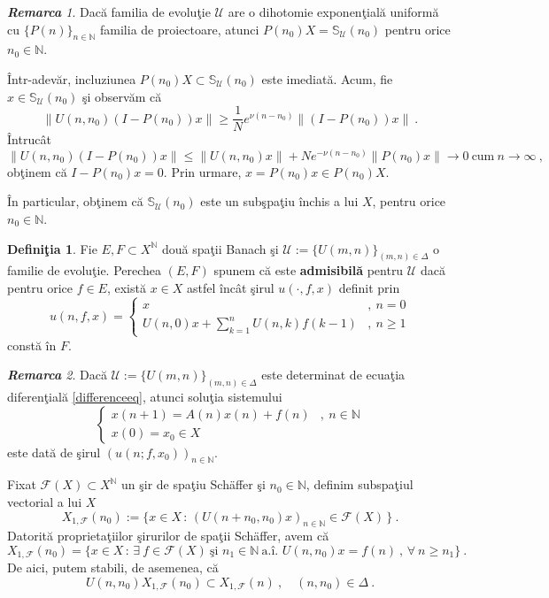 \documentclass[ a4paper, 12pt]{report}
\newcommand{\F}{\mathcal{F}}
\newcommand{\N}{\mathbb{N}}
\newcommand{\defnemph}[1]{\textbf{#1}}
\theoremstyle{definition}
\newtheorem{definition}{\bf Defini\c tia}[section]
\theoremstyle{remark}
\newtheorem{remarc}{\bf Remarca}[section]
\numberwithin{equation}{section}
\begin{document}
\begin{remarc}
Dac\u a familia de evolu\c tie $\mathcal{U}$ are o dihotomie exponen\c tial\u a uniform\u a cu $\{P(n)\}_{n\in\N}$ familia de proiectoare,
atunci $P(n_0)X=\mathbb{S}_{\mathcal{U}}(n_0)$ pentru orice $n_0\in\N$.

\^Intr-adev\u ar, incluziunea $P(n_0)X\subset\mathbb{S}_{\mathcal{U}}(n_0)$ este imediat\u a. Acum, fie \\ $x\in\mathbb{S}_{\mathcal{U}}(n_0)$ %
\c si observ\u am c\u a
$$\|U(n,n_0)(I-P(n_0))x\|\geq \frac{1}{N}e^{\nu(n-n_0)}\|(I-P(n_0))x\|\ .$$
\^Intruc\^at
$$\|U(n,n_0)(I-P(n_0))x\|\leq \|U(n,n_0)x\| + Ne^{-\nu(n-n_0)}\|P(n_0)x\| \to 0 \ \text{cum}\ n\to\infty\ ,$$
ob\c tinem c\u a $I-P(n_0)x=0$. Prin urmare, $x=P(n_0)x\in P(n_0)X$.

\^In particular, ob\c tinem c\u a $\mathbb{S}_{\mathcal{U}}(n_0)$ este un sub\c spa\c tiu \^inchis a lui $X$, pentru orice $n_0\in\N$.
\end{remarc}


\begin{definition}
\label{defn:admissibility}
Fie $E,F\subset X^{\N}$ dou\u a spa\c tii Banach \c si
$\mathcal{U}:=\{U(m,n)\}_{(m,n)\in\Delta}$ o familie de evolu\c tie.
Perechea $(E,F)$ spunem c\u a este \defnemph{admisibil\u a} pentru $\mathcal{U}$ dac\u a
pentru orice $f\in E$, exist\u a $x\in X$ astfel \^inc\^at \c sirul $u(\cdot,f,x)$ definit prin
$$u(n,f,x)= \begin{cases}
x &,\ n=0\\
\displaystyle U(n,0)x + \sum_{k=1}^{n}U(n,k)f(k-1) &,\ n\geq 1
\end{cases}
 $$
const\u a \^in $F$.
\end{definition}

\begin{remarc}
Dac\u a $\mathcal{U}:=\{U(m,n)\}_{(m,n)\in\Delta}$ este determinat de ecua\c tia diferen\c tial\u a \eqref{differenceeq}, atunci
solu\c tia sistemului
$$\begin{cases}
x(n+1)=A(n) x(n) + f(n) &,\ n\in\N\\
x(0)=x_0\in X &
\end{cases} $$
este dat\u a de \c sirul $(u(n;f,x_0))_{n\in\N}$.
\end{remarc}


Fixat $\F(X)\subset X^{\N}$ un \c sir de spa\c tiu Sch\"{a}ffer  \c si
$n_0\in\N$, definim subspa\c tiul vectorial a lui $X$
\begin{equation}
X_{1,\F}(n_0):= \{x\in X\,:\, \left(U(n+n_0,n_0)x\right)_{n\in\N} \in \F(X)\,\}\ .
\end{equation}
Datorit\u a proprieta\c tiilor \c sirurilor de spa\c tii Sch\"{a}ffer, avem c\u a
$$X_{1,\F}(n_0)=\{x\in X\,:\, \exists\ f\in \F(X)\ \text{\c si } n_1\in\N\ \text{a.\^i. }
U(n,n_0)x=f(n)\ \text{, } \forall\ n\geq n_1\}\ .$$
De aici, putem stabili, de asemenea, c\u a
\begin{equation}
U(n,n_0)X_{1,\F}(n_0)\subset X_{1,\F}(n)\ ,\quad (n,n_0)\in\Delta \ .
\end{equation}
\end{document}
